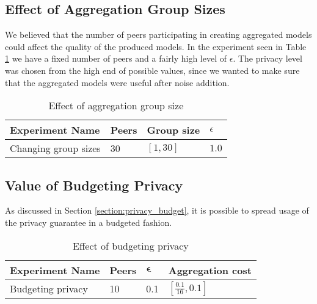 \subsection{Effect of Aggregation Group Sizes}

We believed that the number of peers participating in creating aggregated models could affect the quality of the produced models. In the experiment seen in Table \ref{tab:experiments_group_sizes} we have a fixed number of peers and a fairly high level of $\epsilon$. The privacy level was chosen from the high end of possible values, since we wanted to make sure that the aggregated models were useful after noise addition.

\begin{table}[h]
	\centering
	\label{tab:experiments_group_sizes}
	\begin{tabular}{|l|l|l|l|}
		{\bf Experiment Name} & {\bf Peers} & {\bf Group size} & $\epsilon$ \\
		\hline
		Changing group sizes  & 30          & $[1, 30]$      &     $1.0$     \\ 
	\end{tabular}
	\caption{Effect of aggregation group size}
\end{table}

\subsection{Value of Budgeting Privacy}

As discussed in Section \ref{section:privacy_budget}, it is possible to spread usage of the privacy guarantee in a budgeted fashion.

\begin{table}[h]
	\centering	
	\label{tab:experiments_budgeting_privacy}
	\begin{tabular}{|l|l|l|l|}
		{\bf Experiment Name} & {\bf Peers} & $\boldsymbol{\epsilon}$ & {\bf Aggregation cost}        \\
		\hline
		Budgeting privacy & 10    & 0.1     & $[\frac{0.1}{16}, 0.1]$
	\end{tabular}
	\caption{Effect of budgeting privacy}
\end{table}
